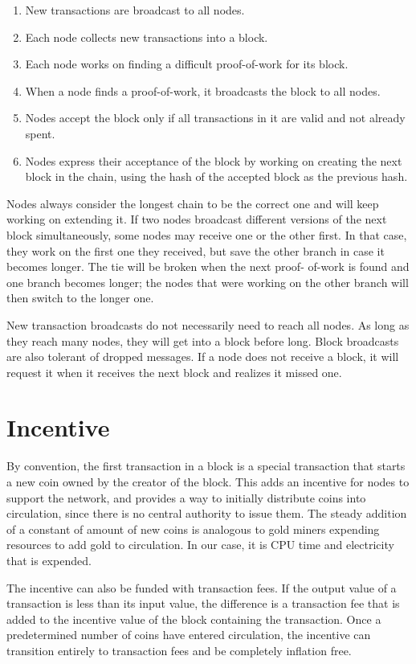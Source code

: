 \documentclass[10pt]{book}
\begin{document}
\begin{enumerate}
\item New transactions are broadcast to all nodes.
\item Each node collects new transactions into a block.
\item Each node works on finding a difficult proof-of-work for its block.
\item When a node finds a proof-of-work, it broadcasts the block to all nodes.
\item Nodes accept the block only if all transactions in it are valid and not already spent.
\item Nodes express their acceptance of the block by working on creating the next block in the chain, using the hash of the accepted block as the previous hash.
\end{enumerate}

Nodes always consider the longest chain to be the correct one and will keep working on extending it.
If two nodes broadcast different versions of the next block simultaneously, some nodes may receive one or the other first.
In that case, they work on the first one they received, but save the other branch in case it becomes longer.
The tie will be broken when the next proof- of-work is found and one branch becomes longer; the nodes that were working on the other branch will then switch to the longer one.

New transaction broadcasts do not necessarily need to reach all nodes.
As long as they reach many nodes, they will get into a block before long.
Block broadcasts are also tolerant of dropped messages.
If a node does not receive a block, it will request it when it receives the next block and realizes it missed one.

\chapter{Incentive}
By convention, the first transaction in a block is a special transaction that starts a new coin owned by the creator of the block.
This adds an incentive for nodes to support the network, and provides a way to initially distribute coins into circulation, since there is no central authority to issue them.
The steady addition of a constant of amount of new coins is analogous to gold miners expending resources to add gold to circulation.
In our case, it is CPU time and electricity that is expended.

The incentive can also be funded with transaction fees.
If the output value of a transaction is less than its input value, the difference is a transaction fee that is added to the incentive value of the block containing the transaction.
Once a predetermined number of coins have entered circulation, the incentive can transition entirely to transaction fees and be completely inflation free.
\end{document}
